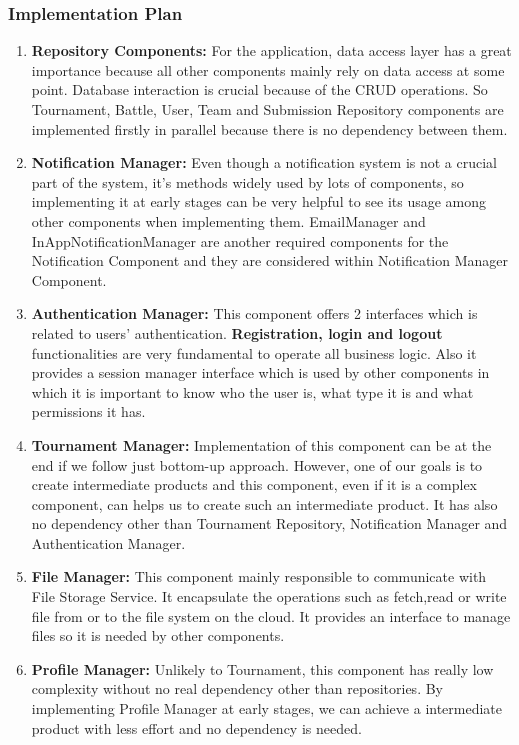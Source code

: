 \subsubsection{Implementation Plan}
\begin{enumerate}
    \item \textbf{Repository Components:} For the application, data access layer has a great importance because all other components mainly rely on data access at some point. Database interaction is crucial because of the CRUD operations. So Tournament, Battle, User, Team and Submission Repository components are implemented firstly in parallel because there is no dependency between them.
    \item \textbf{Notification Manager:} Even though a notification system is not a crucial part of the system, it's methods widely used by lots of components, so implementing it at early stages can be very helpful to see its usage among other components when implementing them. EmailManager and InAppNotificationManager are another required components for the Notification Component and they are considered within Notification Manager Component.
    \item \textbf{Authentication Manager:} This component offers 2 interfaces which is related to users' authentication. \textbf{Registration, login and logout} functionalities are very fundamental to operate all business logic. Also it provides a session manager interface which is used by other components in which it is important to know who the user is, what type it is and what permissions it has.
    \item \textbf{Tournament Manager:} Implementation of this component  can be at the end if we follow just bottom-up approach. However, one of our goals is to create intermediate products and this component, even if it is a complex component, can helps us to create such an intermediate product. It has also no dependency other than Tournament Repository, Notification Manager and Authentication Manager.
    \item \textbf{File Manager:} This component mainly responsible to communicate with File Storage Service. It encapsulate the operations such as fetch,read or write file from or to the file system on the cloud. It provides an interface to manage files so it is needed by other components.
    \item \textbf{Profile Manager:} Unlikely to Tournament, this component has really low complexity without no real dependency other than repositories. By implementing Profile Manager at early stages, we can achieve a intermediate product with less effort and no dependency is needed.

\end{enumerate}
